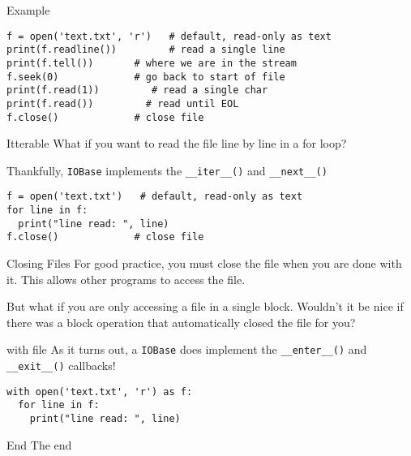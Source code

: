 \begin{frame}[containsverbatim]{Example}
\begin{verbatim}
f = open('text.txt', 'r')   # default, read-only as text
print(f.readline())         # read a single line
print(f.tell())       # where we are in the stream
f.seek(0)             # go back to start of file
print(f.read(1))         # read a single char
print(f.read())         # read until EOL
f.close()             # close file
\end{verbatim}
\end{frame}

\begin{frame}[fragile]{Itterable}
  What if you want to read the file line by line in a for loop? \pause

  Thankfully, \verb|IOBase| implements the \verb|__iter__()| and \verb|__next__()|
  \begin{verbatim}
f = open('text.txt')   # default, read-only as text
for line in f:
  print("line read: ", line)
f.close()             # close file
\end{verbatim}
\end{frame}

\begin{frame}[containsverbatim]{Closing Files}
  For good practice, you must close the file when you are done with it. This allows other programs to access the file.

  But what if you are only accessing a file in a single block. Wouldn't it be nice if there was a block operation that automatically closed the file for you?
\end{frame}

\begin{frame}[containsverbatim]{with file}
  As it turns out, a \verb|IOBase| does implement the \verb|__enter__()| and \verb|__exit__()| callbacks!
\begin{verbatim}
with open('text.txt', 'r') as f:
  for line in f:
    print("line read: ", line)
\end{verbatim}
\end{frame}

\begin{frame}[standout]{End}
  The end
\end{frame}


